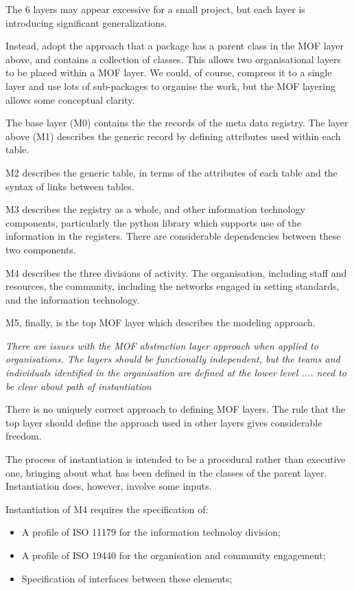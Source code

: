 \documentclass[]{elsarticle}
\begin{document}
The 6 layers may appear excessive for a small project, but each layer is introducing significant generalizations.

Instead, adopt the approach that a package has a parent class in the MOF layer above, and contains a collection of classes. This allows two organisational layers to be placed within a MOF layer. We could, of course, compress it to a single layer and use lots of sub-packages to organise the work, but the MOF layering allows some conceptual clarity. 

The base layer (M0) contains the the records of the meta data registry.
The layer above (M1) describes the generic record by defining attributes used within each table.

M2 describes the generic table, in terms of the attributes of each table and the syntax of links between tables.

M3 describes the registry as a whole, and other information technology components, particularly the python library
which supports use of the information in the registers. There are considerable dependencies between these
two components.

M4 describes the three divisions of activity. The organisation, including staff and resources, the community, including the 
networks engaged in setting standards, and the information technology.

M5, finally, is the top MOF layer which describes the modeling approach.

{\it
There are issues with the MOF abstraction layer approach when applied to organisations. The layers should be
functionally independent, but the teams and individuals identified in the organisation are defined at the lower 
level .... need to be clear about path of instantiation}

There is no uniquely correct approach to defining MOF layers. The rule that the top layer should define the approach used 
in other layers gives considerable freedom.

The process of instantiation is intended to be a procedural rather than executive one, bringing about 
what has been defined in the classes of the parent layer. Instantiation does, however, involve some inputs.

Instantiation of M4 requires the specification of:
\begin{itemize}
\item A profile of ISO 11179 for the information technoloy division;
\item A profile of ISO 19440 for the organisation and community engagement;
\item Specification of interfaces between these elements;
\end{itemize}
\end{document}

